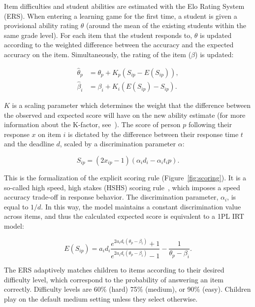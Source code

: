 \documentclass[11pt]{article}
\begin{document}
Item difficulties and student abilities are estimated with the Elo Rating System (ERS). When entering a learning game for the first time, a student is given a provisional ability rating $\theta$ (around the mean of the existing students within the same grade level). For each item that the student responds to, $\theta$ is updated according to the weighted difference between the accuracy and the expected accuracy on the item. Simultaneously, the rating of the item ($\beta$) is updated: 

\begin{align}
    \hat{\theta}_p &= \theta_p + K_p(S_{ip} - E(S_{ip})), \\
    \hat{\beta}_i &= \beta_i + K_i(E(S_{ip}) - S_{ip}).
\end{align}

\noindent $K$ is a scaling parameter which determines the weight that the difference between the observed and expected score will have on the new ability estimate (for more information about the K-factor, see~\textcite{vermeiren2024balancing}). The score of person $p$ following their response $x$ on item $i$ is dictated by the difference between their response time $t$ and the deadline $d$, scaled by a discrimination parameter $\alpha$:

\begin{equation}
    S_{ip} = (2x_{ip} - 1)(\alpha_id_i - \alpha_it_ip).
    \label{eq:scoring}
\end{equation}

\noindent This is the formalization of the explicit scoring rule (Figure~\ref{fig:scoring}). It is a so-called high speed, high stakes (HSHS) scoring rule~\parencite{maris2012speed}, which imposes a speed accuracy trade-off in response behavior. The discrimination parameter, $\alpha_i$, is equal to $1/d$. In this way, the model maintains a constant discrimination value across items, and thus the calculated expected score is equivalent to a 1PL IRT model: 

\begin{equation}
    E(S_{ip}) = a_i d_i \frac{e^{2 a_i d_i (\theta_p - \beta_i)} + 1}{e^{2 a_i d_i (\theta_p - \beta_i)} - 1} - \frac{1}{\theta_p - \beta_i}.
\end{equation}

\noindent The ERS adaptively matches children to items according to their desired difficulty level, which correspond to the probability of answering an item correctly. Difficulty levels are 60\% (hard) 75\% (medium), or 90\% (easy). Children play on the default medium setting unless they select otherwise. 
\end{document}
